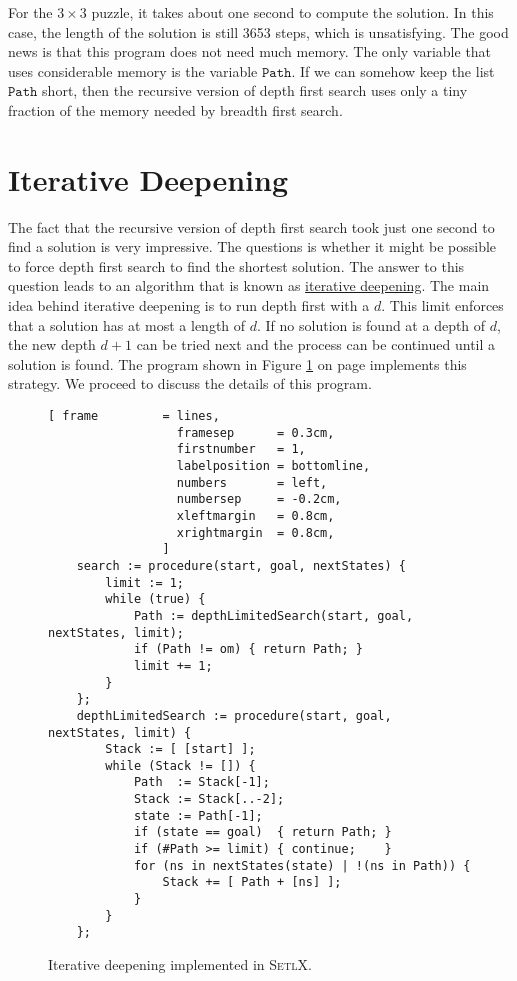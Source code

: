 For the $3 \times 3$ puzzle, it takes about one second to compute the solution.  In this case, the length of
the solution is still 3653 steps, which is unsatisfying.  The good news is that this program does not
need much memory.  The only variable that uses considerable memory is the variable $\mathtt{Path}$.
If we can somehow keep the list $\mathtt{Path}$ short, then the recursive version of depth first search uses only a
tiny fraction of the memory needed by breadth first search.

\section{Iterative Deepening}
The fact that the recursive version of depth first search took just one second to find a solution is
very impressive.  The questions is whether it might be possible to force depth first search to find
the shortest solution.  The answer to this question leads to an algorithm that is known as
\href{https://en.wikipedia.org/wiki/Iterative_deepening_depth-first_search}{iterative deepening}.  The main
idea behind iterative deepening is to run depth first with a  $d$.  This limit
enforces that a solution has at most a length of $d$.  If no solution is found at a depth of $d$, the new depth
$d+1$ can be tried next and the process can be continued until a solution is found.  The program shown in
Figure \ref{fig:iterative-deepening.stlx} on page \pageref{fig:iterative-deepening.stlx} implements this strategy.
We proceed to discuss the details of this program.

\begin{figure}[!ht]
\centering
\begin{Verbatim}[ frame         = lines, 
                  framesep      = 0.3cm, 
                  firstnumber   = 1,
                  labelposition = bottomline,
                  numbers       = left,
                  numbersep     = -0.2cm,
                  xleftmargin   = 0.8cm,
                  xrightmargin  = 0.8cm,
                ]
    search := procedure(start, goal, nextStates) {
        limit := 1;
        while (true) {
            Path := depthLimitedSearch(start, goal, nextStates, limit);
            if (Path != om) { return Path; }
            limit += 1;
        }
    };
    depthLimitedSearch := procedure(start, goal, nextStates, limit) {
        Stack := [ [start] ];
        while (Stack != []) {
            Path  := Stack[-1];
            Stack := Stack[..-2];
            state := Path[-1];
            if (state == goal)  { return Path; }
            if (#Path >= limit) { continue;    }
            for (ns in nextStates(state) | !(ns in Path)) {  
                Stack += [ Path + [ns] ];
            }
        }
    };
\end{Verbatim}
\vspace*{-0.3cm}
\caption{Iterative deepening implemented in \textsc{SetlX}.}
\label{fig:iterative-deepening.stlx}
\end{figure}

